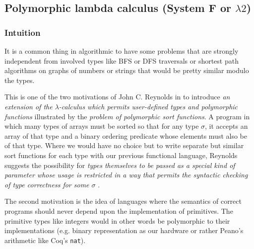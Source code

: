 \documentclass{article}
\begin{document}
    
    
    
\subsection{Polymorphic lambda calculus (System F or $\lambda2$)}
    \subsubsection{Intuition}
    It is a common thing in algorithmic to have some problems that are strongly independent from involved types like BFS or DFS traversals or shortest path algorithms on graphs of numbers or strings that would be pretty similar modulo the types.\par
    This is one of the two motivations of John C. Reynolds in \cite{Reynolds1974TowardsAT} to introduce \textit{an extension of the $\lambda$-calculus which permits user-defined types and polymorphic functions} illustrated by the \textit{problem of polymorphic sort functions}. A program in which many types of arrays must be sorted so that for any type $\sigma$, it accepts an array of that type and a binary ordering predicate whose elements must also be of that type. Where we would have no choice but to write separate but similar sort functions for each type with our previous functional language, Reynolds suggests the possibility for \textit{types themselves to be passed as a special kind of parameter whose usage is restricted in a way that permits the syntactic checking of type correctness for some $\sigma$ }.\par
    The second motivation is the idea of languages where the semantics of correct programs should never depend upon the implementation of primitives. The primitive types like integers would in other words be polymorphic to their implementations (e.g. binary representation as our hardware or rather Peano's arithmetic like Coq's \texttt{nat}).
\end{document}
